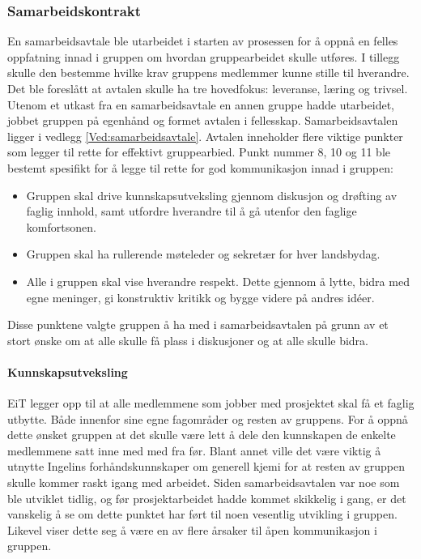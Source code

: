 \subsubsection{Samarbeidskontrakt}
En samarbeidsavtale ble utarbeidet i starten av prosessen for å oppnå en felles oppfatning innad i gruppen om hvordan gruppearbeidet skulle utføres.
I tillegg skulle den bestemme hvilke krav gruppens medlemmer kunne stille til hverandre.
Det ble foreslått at avtalen skulle ha tre hovedfokus: leveranse, læring og trivsel.
Utenom et utkast fra en samarbeidsavtale en annen gruppe hadde utarbeidet, jobbet gruppen på egenhånd og formet avtalen i fellesskap.
Samarbeidsavtalen ligger i vedlegg \ref{Ved:samarbeidsavtale}.
Avtalen inneholder flere viktige punkter som legger til rette for effektivt gruppearbied.
Punkt nummer 8, 10 og 11 ble bestemt spesifikt for å legge til rette for god kommunikasjon innad i gruppen:
\begin{itemize}
	\item Gruppen skal drive kunnskapsutveksling gjennom diskusjon og drøfting av faglig innhold, samt utfordre hverandre til å gå utenfor den faglige komfortsonen.
	\item Gruppen skal ha rullerende møteleder og sekretær for hver landsbydag.
	\item Alle i gruppen skal vise hverandre respekt. Dette gjennom å lytte, bidra med egne meninger, gi konstruktiv kritikk og bygge videre på andres id\'{e}er.
\end{itemize}

Disse punktene valgte gruppen å ha med i samarbeidsavtalen på grunn av et stort ønske om at alle skulle få plass i diskusjoner og at alle skulle bidra.

\paragraph{Kunnskapsutveksling}
EiT legger opp til at alle medlemmene som jobber med prosjektet skal få et faglig utbytte.
Både innenfor sine egne fagområder og resten av gruppens.
For å oppnå dette ønsket gruppen at det skulle være lett å dele den kunnskapen de enkelte medlemmene satt inne med med fra før.
Blant annet ville det være viktig å utnytte Ingelins forhåndskunnskaper om generell kjemi for at resten av gruppen skulle kommer raskt igang med arbeidet.
Siden samarbeidsavtalen var noe som ble utviklet tidlig, og før prosjektarbeidet hadde kommet skikkelig i gang, er det vanskelig å se om dette punktet har ført til noen vesentlig utvikling i gruppen.
Likevel viser dette seg å være en av flere årsaker til åpen kommunikasjon i gruppen.

